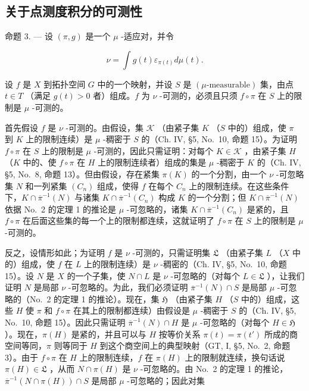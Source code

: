 \subsection{关于点测度积分的可测性}

命题 3. --- 设 \((\pi, g)\) 是一个 \(\mu\) -适应对，并令

\[
\nu = \int g (t) \varepsilon_ {\pi (t)} d \mu (t).
\]

设 \(f\) 是 \(X\) 到拓扑空间 \(G\) 中的一个映射，并设 \(S\) 是 \((\mu\text{-measurable})\) 集，由点 \(t \in T\) （满足 \(g(t) > 0\) 者）组成。\(f\) 为 \(\nu\) -可测的，必须且只须 \(f \circ \pi\) 在 \(S\) 上的限制是 \(\mu\) -可测的。

首先假设 \(f\) 是 \(\nu\) -可测的。由假设，集 \(\mathcal{K}\) （由紧子集 \(K\) （\(S\) 中的）组成，使 \(\pi\) 到 \(K\) 上的限制连续）是 \(\mu\) -稠密于 \(S\) 的（Ch. IV, §5, No.~10, 命题 15）。为证明 \(f \circ \pi\) 在 \(S\) 上的限制是 \(\mu\) -可测的，因此只需证明：对每个 \(K \in \mathcal{K}\) ，由紧子集 \(H\) （\(K\) 中的、使 \(f \circ \pi\) 在 \(H\) 上的限制连续者）组成的集是 \(\mu\) -稠密于 \(K\) 的（Ch. IV, §5, No.~8, 命题 13）。但由假设，存在紧集 \(\pi(K)\) 的一个分割，由一个 \(\nu\) -可忽略集 \(N\) 和一列紧集 \((C_n)\) 组成，使得 \(f\) 在每个 \(C_n\) 上的限制连续。在这些条件下，\(K \cap \overline{\pi}^{-1}(N)\) 与诸集 \(K \cap \overline{\pi}^{-1}(C_n)\) 构成 \(K\) 的一个分割；但 \(K \cap \overline{\pi}^{-1}(N)\) 依据 No.~2 的定理 1 的推论是 \(\mu\) -可忽略的，诸集 \(K \cap \overline{\pi}^{-1}(C_n)\) 是紧的，且 \(f \circ \pi\) 在后面这些集的每一个上的限制都连续，这就证明了 \(f \circ \pi\) 在 \(S\) 上的限制是 \(\mu\) -可测的。

反之，设情形如此；为证明 \(f\) 是 \(\nu\) -可测的，只需证明集 \(\mathfrak{L}\) （由紧子集 \(L\) （\(X\) 中的）组成，使 \(f\) 在 \(L\) 上的限制连续）是 \(\nu\) -稠密的（Ch. IV, §5, No.~10, 命题 15）。设 \(N\) 是 \(X\) 的一个子集，使 \(N \cap L\) 是 \(\nu\) -可忽略的（对每个 \(L \in \mathfrak{L}\) ），让我们证明 \(N\) 是局部 \(\nu\) -可忽略的。为此，我们必须证明 \(\overline{\pi}^{-1}(N) \cap S\) 是局部 \(\mu\) -可忽略的（No.~2 的定理 1 的推论）。现在，集 \(\mathfrak{H}\) （由紧子集 \(H\) （\(S\) 中的）组成，这些 \(H\) 使 \(\pi\) 和 \(f \circ \pi\) 在其上的限制都连续）由假设是 \(\mu\) -稠密于 \(S\) 的（Ch. IV, §5, No.~10, 命题 15）。因此只需证明 \(\overline{\pi}^{-1}(N) \cap H\) 是 \(\mu\) -可忽略的（对每个 \(H \in \mathfrak{H}\) ）。现在，\(\pi(H)\) 是紧的，并且可以与 \(H\) 按等价关系 \(\pi(t) = \pi(t')\) 所成的商空间等同，\(\pi\) 则等同于 \(H\) 到这个商空间上的典型映射（GT, I, §5, No.~2, 命题 3）。由于 \(f \circ \pi\) 在 \(H\) 上的限制连续，\(f\) 在 \(\pi(H)\) 上的限制就连续，换句话说 \(\pi(H) \in \mathfrak{L}\) ，从而 \(N \cap \pi(H)\) 是 \(\nu\) -可忽略的。由 No.~2 的定理 1 的推论，\(\overline{\pi}^{-1}(N \cap \pi(H)) \cap S\) 是局部 \(\mu\) -可忽略的；因此对集

